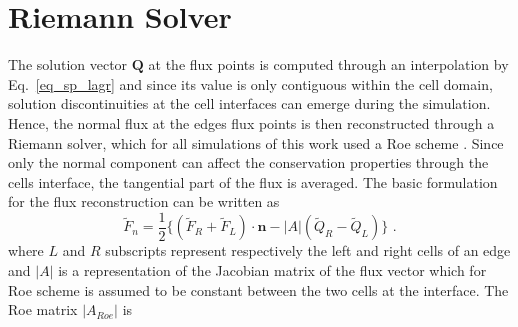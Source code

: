 %

\section{Riemann Solver}
The solution vector $\textbf{Q}$ at the flux points is computed through an interpolation by Eq.\ \ref{eq_sp_lagr} and since its value is only contiguous within the cell domain, solution discontinuities at the cell interfaces can emerge during the simulation. Hence, the normal flux at the edges flux points is then reconstructed through a Riemann solver, which for all simulations of this work used a Roe scheme \cite{Roe1981}. Since only the normal component can affect the conservation properties through the cells interface, the tangential part of the flux is averaged. The basic formulation for the flux reconstruction can be written as 
%
\begin{equation}
    \label{eq_riemann}
    \tilde{F}_n = \frac{1}{2}\{(\tilde{F}_R + \tilde{F}_L) \cdot \textbf{n} - |A| (\tilde{Q}_R - \tilde{Q}_L)\}
    \mbox{ .}
\end{equation}
%
where $L$ and $R$ subscripts represent  respectively the left and right cells of an edge and $|A|$ is a representation of 
the Jacobian matrix of the flux vector which for Roe scheme is assumed to be constant between the two cells at the interface. The Roe matrix $|A_{Roe}|$ is

